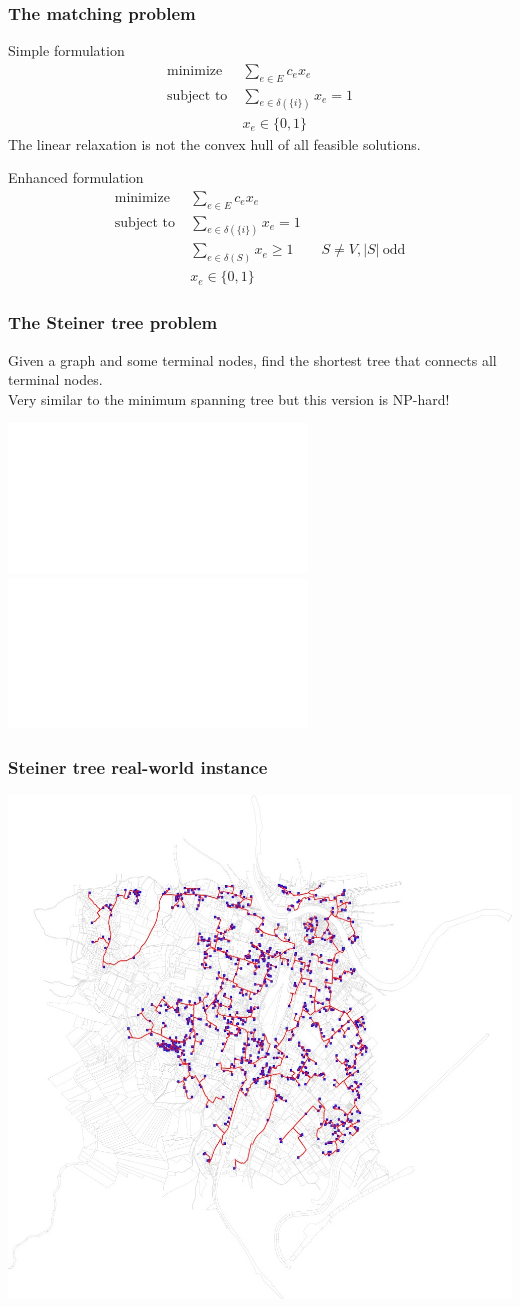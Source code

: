\documentclass[9pt]{beamer}
\begin{document}
\begin{frame}
\frametitle{The matching problem}
\begin{block}{Simple formulation}
\begin{align*} 
\text{minimize} \;&\sum_{e\in E} c_ex_e\\
\text{subject to}\;& \sum_{e\in \delta(\{i\})} x_e = 1\\
& x_e\in \{0,1\}
\end{align*}
The linear relaxation is \alert{not the convex hull} of all
feasible solutions.
\end{block}
\begin{block}{Enhanced formulation}
\begin{align*} 
\text{minimize} \;&\sum_{e\in E} c_ex_e\\
\text{subject to}\;& \sum_{e\in \delta(\{i\})} x_e = 1\\
&\sum_{e\in \delta(S)}x_e\geq 1\qquad S\neq V, |S| \ \text{odd}\\
& x_e\in \{0,1\}
\end{align*}
\end{block}
\end{frame}
\begin{frame}
\frametitle{The Steiner tree problem}
Given a graph and some \alert{terminal nodes},
find the shortest tree that connects all terminal nodes.\\
Very similar to the minimum spanning tree but this version is \alert{NP-hard}!
\begin{center}
\includegraphics<1>[width=.5\linewidth]{steiner_instance.pdf}
\includegraphics<2>[width=.5\linewidth]{steiner_sol.pdf}
\end{center}
\end{frame}
\begin{frame}
\frametitle{Steiner tree real-world instance}
\begin{center}
\includegraphics[width=\linewidth]{U-G107.jpg}
\end{center}
\end{frame}
\end{document}
